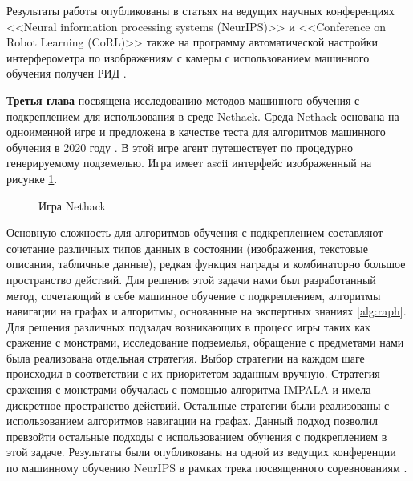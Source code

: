 Результаты работы опубликованы в статьях \cite{confbib1, confbib2} на ведущих научных конференциях <<Neural information processing systems (NeurIPS)>> и <<Conference on Robot Learning (CoRL)>> также на программу автоматической настройки интерферометра по изображениям с камеры с использованием машинного обучения получен РИД \cite{progbib1}.

\underline{\textbf{Третья глава}} посвящена исследованию методов машинного обучения с подкреплением для использования в среде Nethack. Среда Nethack основана на одноименной игре и предложена в качестве теста для алгоритмов машинного обучения в 2020 году \cite{nethack}. В этой игре агент путешествует по процедурно генерируемому подземелью. Игра имеет ascii интерфейс изображенный на рисунке \ref{fig:nethack}.

\begin{figure}[ht]
    \caption{Игра Nethack}\label{fig:nethack}
\end{figure}

Основную сложность для алгоритмов обучения с подкреплением составляют сочетание различных типов данных в состоянии (изображения, текстовые описания, табличные данные), редкая функция награды и комбинаторно большое пространство действий. Для решения этой задачи нами был разработанный метод, сочетающий в себе машинное обучение с подкреплением, алгоритмы навигации на графах и алгоритмы, основанные на экспертных знаниях \ref{alg:raph}. Для решения различных подзадач возникающих в процесс игры таких как сражение с монстрами, исследование подземелья, обращение с предметами нами была реализована отдельная стратегия. Выбор стратегии на каждом шаге происходил в соответствии с их приоритетом заданным вручную. Стратегия сражения с монстрами обучалась с помощью алгоритма IMPALA \cite{impala} и имела дискретное пространство действий. Остальные стратегии были реализованы с использованием алгоритмов навигации на графах. Данный подход позволил превзойти остальные подходы с использованием обучения с подкреплением в этой задаче. Результаты были опубликованы на одной из ведущих конференции по машинному обучению NeurIPS в рамках трека посвященного соревнованиям \cite{confbib3}.


